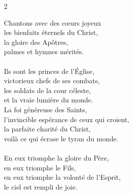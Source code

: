 \documentclass[11pt, twoside, french, openany]{book}
\begin{document}

\null\newpage

	{}{}{2}{}
	{}{}{}
	{}
	{}




\begin{multicols}{2}
Chantons avec des cœurs joyeux\\
les bienfaits éternels du Christ,\\
la gloire des Apôtres,\\
palmes et hymnes mérités.\\
~\\
Ils sont les princes de l’Église,\\
victorieux chefs de ses combats,\\
les soldats de la cour céleste,\\
et la vraie lumière du monde.\\

La foi généreuse des Saints,\\
l’invincible espérance de ceux qui croient,\\
la parfaite charité du Christ,\\
voilà ce qui écrase le tyran du monde.\\
~\\
En eux triomphe la gloire du Père,\\
en eux triomphe le Fils,\\
en eux triomphe la volonté de l’Esprit,\\
le ciel est rempli de joie.
\end{multicols}
\end{document}
